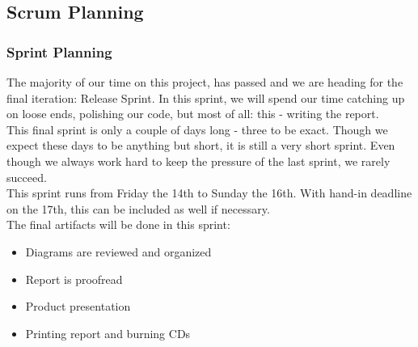 \subsection{Scrum Planning}
\subsubsection{Sprint Planning}
The majority of our time on this project, has passed and we are heading for the final iteration: Release Sprint. In this sprint, we will spend our time catching up on loose ends, polishing our code, but most of all: this - writing the report.\\
This final sprint is only a couple of days long - three to be exact. Though we expect these days to be anything but short, it is still a very short sprint. Even though we always work hard to keep the pressure of the last sprint, we rarely succeed.\\
This sprint runs from Friday the 14th to Sunday the 16th. With hand-in deadline on the 17th, this can be included as well if necessary.\\
The final artifacts will be done in this sprint: 
\begin{itemize}
\item Diagrams are reviewed and organized
\item Report is proofread
\item Product presentation 
\item Printing report and burning CDs
\end{itemize}